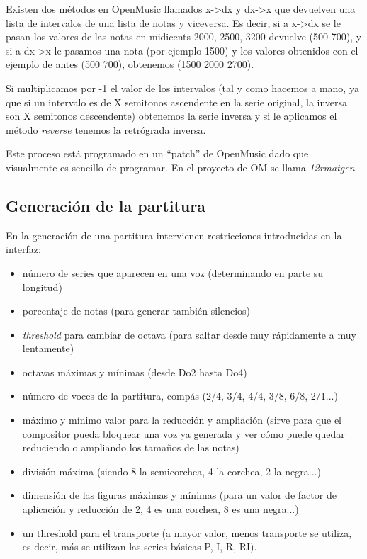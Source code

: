 \documentclass[a4paper,openany,oneside,12pt]{book}
\begin{document}
Existen dos métodos en OpenMusic llamados x->dx y dx->x que devuelven una lista de intervalos de una lista de notas y viceversa. Es decir, si a x->dx se le pasan los valores de las notas en midicents 2000, 2500, 3200 devuelve (500 700), y si a dx->x le pasamos una nota (por ejemplo 1500) y los valores obtenidos con el ejemplo de antes (500 700), obtenemos (1500 2000 2700).

Si multiplicamos por -1 el valor de los intervalos (tal y como hacemos a mano, ya que si un intervalo es de X semitonos ascendente en la serie original, la inversa son X semitonos descendente) obtenemos la serie inversa y si le aplicamos el método \emph{reverse} tenemos la retrógrada inversa.

Este proceso está programado en un ``patch'' de OpenMusic dado que visualmente es sencillo de programar. En el proyecto de OM se llama \emph{12rmatgen}.

\subsection{Generación de la partitura}
En la generación de una partitura intervienen restricciones introducidas en la interfaz: 
\begin{itemize}
\item número de series que aparecen en una voz (determinando en parte su longitud)
\item porcentaje de notas (para generar también silencios)
\item \emph{threshold} para cambiar de octava (para saltar desde muy rápidamente a muy lentamente)
\item octavas máximas y mínimas (desde Do2 hasta Do4)
\item número de voces de la partitura, compás (2/4, 3/4, 4/4, 3/8, 6/8, 2/1...)
\item máximo y mínimo valor para la reducción y ampliación (sirve para que el compositor pueda bloquear una voz ya generada y ver cómo puede quedar reduciendo o ampliando los tamaños de las notas)
\item división máxima (siendo 8 la semicorchea, 4 la corchea, 2 la negra...)
\item dimensión de las figuras máximas y mínimas (para un valor de factor de aplicación y reducción de 2, 4 es una corchea, 8 es una negra...)
\item un threshold para el transporte (a mayor valor, menos transporte se utiliza, es decir, más se utilizan las series básicas P, I, R, RI).
\end{itemize}
\end{document}
